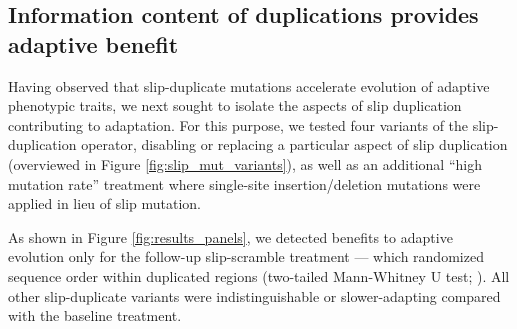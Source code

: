 
\subsection{Information content of duplications provides adaptive benefit}

Having observed that slip-duplicate mutations accelerate evolution of adaptive phenotypic traits, we next sought to isolate the aspects of slip duplication contributing to adaptation.
For this purpose, we tested four variants of the slip-duplication operator, disabling or replacing a particular aspect of slip duplication (overviewed in Figure \ref{fig:slip_mut_variants}), as well as an additional ``high mutation rate'' treatment where single-site insertion/deletion mutations were applied in lieu of slip mutation.

As shown in Figure \ref{fig:results_panels}, we detected benefits to adaptive evolution only for the follow-up slip-scramble treatment --- which randomized sequence order within duplicated regions (two-tailed Mann-Whitney U test; ).
All other slip-duplicate variants were indistinguishable or slower-adapting compared with the baseline treatment.


